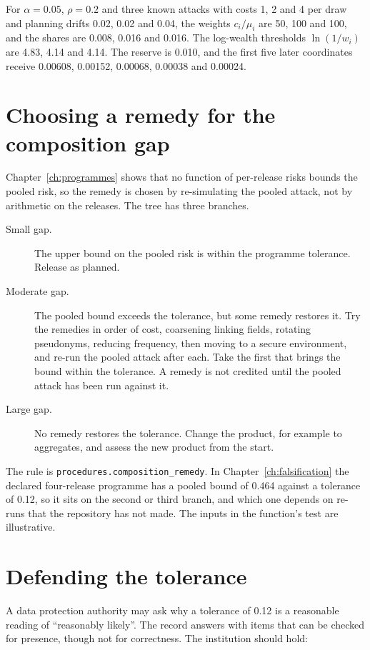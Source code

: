 For $\alpha = 0.05$, $\rho = 0.2$ and three known attacks with costs 1, 2 and 4 per draw and
planning drifts 0.02, 0.02 and 0.04, the weights $c_i/\mu_i$ are 50, 100 and 100, and the
shares are 0.008, 0.016 and 0.016. The log-wealth thresholds $\ln(1/w_i)$ are 4.83, 4.14 and
4.14. The reserve is 0.010, and the first five later coordinates receive 0.00608, 0.00152,
0.00068, 0.00038 and 0.00024.

\section{Choosing a remedy for the composition gap}\label{app:b-remedy}

Chapter~\ref{ch:programmes} shows that no function of per-release risks bounds the pooled
risk, so the remedy is chosen by re-simulating the pooled attack, not by arithmetic on the
releases. The tree has three branches.

\begin{description}
\item[Small gap.] The upper bound on the pooled risk is within the programme tolerance.
Release as planned.
\item[Moderate gap.] The pooled bound exceeds the tolerance, but some remedy restores it. Try
the remedies in order of cost, coarsening linking fields, rotating pseudonyms, reducing
frequency, then moving to a secure environment, and re-run the pooled attack after each. Take
the first that brings the bound within the tolerance. A remedy is not credited until the
pooled attack has been run against it.
\item[Large gap.] No remedy restores the tolerance. Change the product, for example to
aggregates, and assess the new product from the start.
\end{description}

The rule is \texttt{procedures.\allowbreak{}composition\_\allowbreak{}remedy}. In Chapter~\ref{ch:falsification}
the declared four-release programme has a pooled bound of 0.464 against a tolerance of 0.12, so
it sits on the second or third branch, and which one depends on re-runs that the repository
has not made. The inputs in the function's test are illustrative.

\section{Defending the tolerance}\label{app:b-legal}

A data protection authority may ask why a tolerance of 0.12 is a reasonable reading of
``reasonably likely''. The record answers with items that can be checked for presence, though
not for correctness. The institution should hold:

